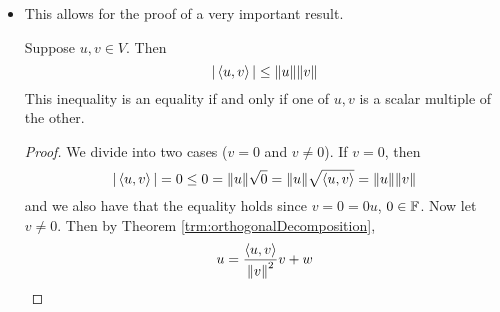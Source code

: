 \documentclass[../main.tex]{subfiles}
\begin{document}
\begin{itemize}
\begin{theorem}
\begin{figure}[h!]
\begin{tikzpicture}[
                every path/.append style={blue,semithick},
                every node/.append style={black}
            ]
            \end{tikzpicture}
            \caption{An orthogonal decomposition.}
            \label{fig:orthogonalDecomposition}
        \end{figure}
        \begin{proof}
            We want to write $u$ in the form $u=cv+w$ where $w$ is orthogonal to $v$. We know that
            \begin{equation*}
                u=cv+(u-cv)
            \end{equation*}
            so we need only choose $c$ such that $v$ is orthogonal to $u-cv$. In other words, we want
            \begin{align*}
                0 &= \inp{u-cv}{v}\\
                &= \inp{u}{v}+\inp{-cv}{v}\\
                &= \inp{u}{v}-c\inp{v}{v}\\
                &= \inp{u}{v}-c\norm{v}^2\\
                c &= \frac{\inp{u}{v}}{\norm{v}^2}
            \end{align*}
            But this gives the values we want for $c$ and $w$, as desired.
        \end{proof}
    \end{theorem}
    \item This allows for the proof of a very important result.
    \begin{theorem}\label{trm:CauchySchwarz}
        Suppose $u,v\in V$. Then
        \begin{equation*}
            |\inp{u}{v}| \leq \norm{u}\norm{v}
        \end{equation*}
        This inequality is an equality if and only if one of $u,v$ is a scalar multiple of the other.
        \begin{proof}
            We divide into two cases ($v=0$ and $v\neq 0$). If $v=0$, then
            \begin{equation*}
                |\inp{u}{v}| = 0 \leq 0 = \norm{u}\sqrt{0} = \norm{u}\sqrt{\inp{u}{v}} = \norm{u}\norm{v}
            \end{equation*}
            and we also have that the equality holds since $v=0=0u$, $0\in\F$. Now let $v\neq 0$. Then by Theorem \ref{trm:orthogonalDecomposition},
            \begin{equation*}
                u = \frac{\inp{u}{v}}{\norm{v}^2}v+w
            \end{equation*}

\end{proof}
\end{theorem}
\end{itemize}
\end{document}
